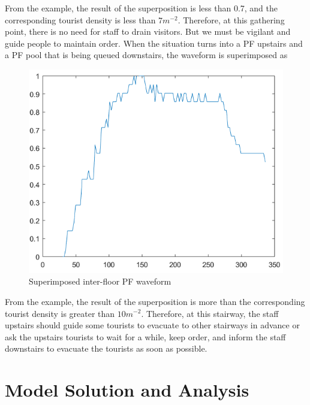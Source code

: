From the example, the result of the superposition is less than 0.7, and the corresponding tourist density is less than $7m^{-2}$. Therefore, at this gathering point, there is no need for staff to drain visitors. But we must be vigilant and guide people to maintain order.
When the situation turns into a PF upstairs and a PF pool that is being queued downstairs, the waveform is superimposed as
\begin{figure}[H]
    \centering
    \includegraphics[scale=0.6]{06.png}
    \caption{Superimposed inter-floor PF waveform }
    \label{1}
\end{figure}

From the example, the result of the superposition is more than the corresponding tourist density is greater than $10m^{-2}$. Therefore, at this stairway, the staff upstairs should guide some tourists to evacuate to other stairways in advance or ask the upstairs tourists to wait for a while, keep order, and inform the staff downstairs to evacuate the tourists as soon as possible.

\section{Model Solution and Analysis}
